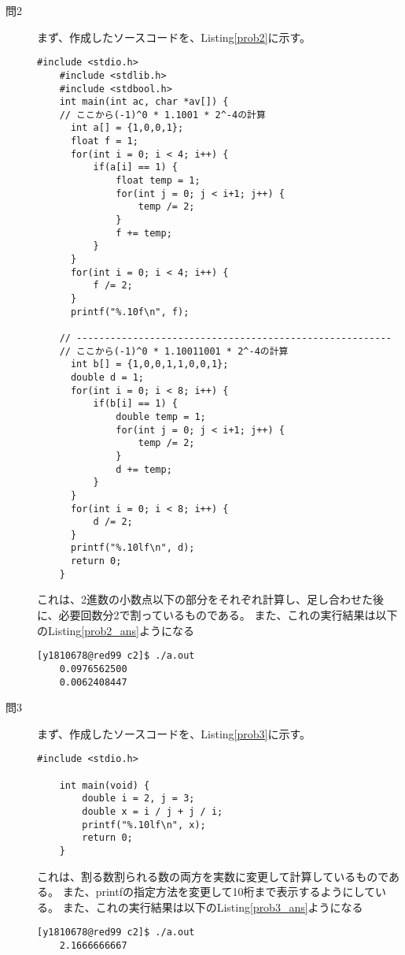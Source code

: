 \documentclass{jsarticle}
\begin{document}
\begin{description}
    \item[問2]
    まず、作成したソースコードを、Listing\ref{prob2}に示す。
    \begin{lstlisting}[caption=問2のソースコード, label=prob2]
    #include <stdio.h>
    #include <stdlib.h>
    #include <stdbool.h>
    int main(int ac, char *av[]) {
    // ここから(-1)^0 * 1.1001 * 2^-4の計算
      int a[] = {1,0,0,1};
      float f = 1;
      for(int i = 0; i < 4; i++) {
          if(a[i] == 1) {
              float temp = 1;
              for(int j = 0; j < i+1; j++) {
                  temp /= 2;
              }
              f += temp;
          }
      }
      for(int i = 0; i < 4; i++) {
          f /= 2;
      }
      printf("%.10f\n", f);

    // --------------------------------------------------------
    // ここから(-1)^0 * 1.10011001 * 2^-4の計算
      int b[] = {1,0,0,1,1,0,0,1};
      double d = 1;
      for(int i = 0; i < 8; i++) {
          if(b[i] == 1) {
              double temp = 1;
              for(int j = 0; j < i+1; j++) {
                  temp /= 2;
              }
              d += temp;
          }
      }
      for(int i = 0; i < 8; i++) {
          d /= 2;
      }
      printf("%.10lf\n", d);
      return 0;
    }
    \end{lstlisting}
    これは、2進数の小数点以下の部分をそれぞれ計算し、足し合わせた後に、必要回数分2で割っているものである。
    また、これの実行結果は以下のListing\ref{prob2_ans}ようになる
    \begin{lstlisting}[caption=問2の実行結果, label=prob2_ans]
    [y1810678@red99 c2]$ ./a.out
    0.0976562500
    0.0062408447
    \end{lstlisting}

    \item[問3]
    まず、作成したソースコードを、Listing\ref{prob3}に示す。
    \begin{lstlisting}[caption=問3のソースコード, label=prob3]
    #include <stdio.h>

    int main(void) {
        double i = 2, j = 3;
        double x = i / j + j / i;
        printf("%.10lf\n", x);
        return 0;
    }
    \end{lstlisting}
    これは、割る数割られる数の両方を実数に変更して計算しているものである。
    また、printfの指定方法を変更して10桁まで表示するようにしている。
    また、これの実行結果は以下のListing\ref{prob3_ans}ようになる
    \begin{lstlisting}[caption=問3の実行結果, label=prob3_ans]
    [y1810678@red99 c2]$ ./a.out
    2.1666666667
    \end{lstlisting}


\end{description}
\end{document}
